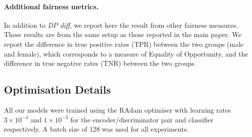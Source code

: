 \begin{table}[tbp]
    \caption{
        Additional fairness metrics for the experiments on the CelebA dataset (Fig. 5 from the main text).
        \emph{TPR diff.} refers to the difference in true positive rate.
        \emph{TNR diff.} refers to the difference in true negative rate.
        \textsc{Left:} $\eta = 0$. \textsc{Right:} $\eta=1$.
    }
    \label{tab:my_label}
\hfill
{}
\end{table}
\paragraph{Additional fairness metrics.}
In addition to \emph{DP diff}, we report here the result from other fairness measures.
These results are from the same setup as those reported in the main paper.
We report the difference in true positive rates (TPR) between the two groups (male and female), which corresponds to a measure of Equality of Opportunity,
and the difference in true negative rates (TNR) between the two groups.

\subsection{Optimisation Details}\label{sec:optimisation-details}
\noindent All our models were trained using the RAdam optimiser \citep{liu2019variance} with learning rates $3\times10^{-4}$ and $1\times10^{-3}$ for the encoder/discriminator pair and classifier respectively. A batch size of 128 was used for all experiments.

